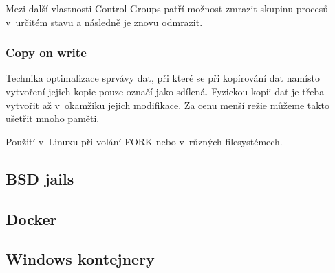Mezi další vlastnosti Control Groups patří možnost zmrazit skupinu procesů v~určitém stavu a následně je znovu odmrazit. %


\subsubsection{Copy on write}

Technika optimalizace sprvávy dat, při které se při kopírování dat namísto vytvoření jejich kopie pouze označí jako sdílená.
Fyzickou kopii dat je třeba vytvořit až v~okamžiku jejich modifikace.
Za cenu menší režie můžeme takto ušetřit mnoho paměti.


Použití v~Linuxu při volání FORK nebo v~různých filesystémech.

\subsection{BSD jails}


\subsection{Docker}

\subsection{Windows kontejnery}
